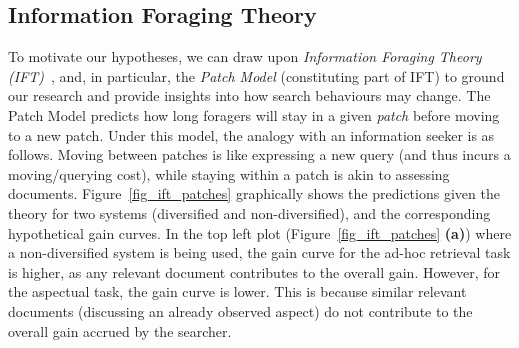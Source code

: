 \subsection{Information Foraging Theory} \label{sec:ift}


To motivate our hypotheses, we can draw upon \emph{Information Foraging Theory (IFT)}~\cite{pirolli1999ift}, and, in particular, the \textit{Patch Model} (constituting part of IFT) to ground our research and provide insights into how search behaviours may change. %
The Patch Model predicts how long foragers will stay in a given \emph{patch} before moving to a new patch. Under this model, the analogy with an information seeker is as follows. Moving between patches is like expressing a new query (and thus incurs a moving/querying cost), while staying within a patch is akin to assessing documents. 
Figure~\ref{fig_ift_patches} graphically shows the predictions given the theory for two systems (diversified and non-diversified), and the corresponding hypothetical gain curves. In the top left plot (Figure~\ref{fig_ift_patches} \textbf{(a)}) where a non-diversified system is being used, the gain curve for the ad-hoc retrieval task is higher, as any relevant document contributes to the overall gain. However, for the aspectual task, the gain curve is lower. This is because similar relevant documents (discussing an already observed aspect) do not contribute to the overall gain accrued by the searcher.

